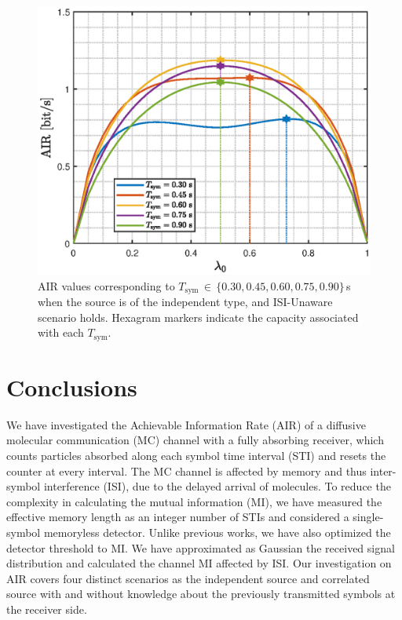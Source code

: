 \documentclass[journal]{IEEEtranTCOM}
\begin{document}
\begin{figure}
    \centering
    \includegraphics[width=1\linewidth]{Figures/cross_AIR_IND_UNAWARE.eps}
    \caption{AIR values corresponding to $T_{\mathrm{sym}}$$\,\in\,$$\{0.30,0.45,0.60,0.75,0.90\}$\,s when the source is of the independent type, and ISI-Unaware scenario holds. Hexagram markers indicate the capacity associated with each $T_{\mathrm{sym}}$.}
    \label{fig:Cross_IND_UNAWARE}
\end{figure}
\section{Conclusions}\label{sec:conclusion}

We have investigated the Achievable Information Rate (AIR) of a diffusive molecular communication (MC) channel with a fully absorbing receiver, which counts particles absorbed along each symbol time interval (STI) and resets the counter at every interval. The MC channel is affected by memory and thus inter-symbol interference (ISI), due to the delayed arrival of molecules. 
To reduce the complexity in calculating the mutual information (MI), we have measured the effective memory length as an integer number of STIs and considered a single-symbol memoryless detector. Unlike previous works, we have also optimized the detector threshold to MI. We have approximated as Gaussian the received signal distribution and calculated the channel MI affected by ISI. Our investigation on AIR covers four distinct scenarios as the independent source and correlated source with and without knowledge about the previously transmitted symbols at the receiver side.
\end{document}

